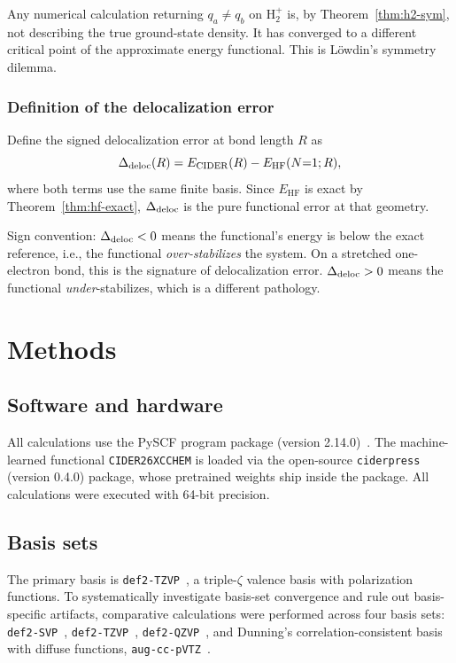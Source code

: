 \documentclass[11pt]{report}
\theoremstyle{definition}
\theoremstyle{remark}
\newcommand{\EHF}{E_{\mathrm{HF}}}
\newcommand{\ECD}{E_{\mathrm{CIDER}}}
\begin{document}
Any numerical calculation returning $q_a \ne q_b$ on H$_2^+$ is, by
Theorem~\ref{thm:h2-sym}, not describing the true ground-state density.
It has converged to a different critical point of the approximate energy
functional. This is L\"owdin's symmetry dilemma.

\subsection{Definition of the delocalization error}

Define the signed delocalization error at bond length $R$ as
\begin{equation}
\Delta_{\rm deloc}(R) = \ECD(R) - \EHF(N{=}1; R),
\label{eq:deloc-def}
\end{equation}
where both terms use the same finite basis. Since $\EHF$ is exact by
Theorem~\ref{thm:hf-exact}, $\Delta_{\rm deloc}$ is the pure functional
error at that geometry.

Sign convention: $\Delta_{\rm deloc} < 0$ means the functional's energy is
below the exact reference, i.e., the functional \emph{over-stabilizes}
the system. On a stretched one-electron bond, this is the signature of
delocalization error. $\Delta_{\rm deloc} > 0$ means the functional
\emph{under}-stabilizes, which is a different pathology.

\chapter{Methods}
\label{ch:methods}

\section{Software and hardware}

All calculations use the PySCF program package (version 2.14.0)~\cite{PySCF2018,PySCF2020}. The machine-learned functional
\texttt{CIDER26XCCHEM} is loaded via the open-source \texttt{ciderpress} (version 0.4.0)
package, whose pretrained weights ship inside the package. All calculations were executed with 64-bit precision.

\section{Basis sets}

The primary basis is \texttt{def2-TZVP}~\cite{Weigend2005}, a triple-$\zeta$ valence basis
with polarization functions. To systematically investigate basis-set convergence and rule out basis-specific artifacts,
comparative calculations were performed across four basis sets: \texttt{def2-SVP}~\cite{Weigend2005}, \texttt{def2-TZVP}~\cite{Weigend2005},
\texttt{def2-QZVP}~\cite{Weigend2005}, and Dunning's correlation-consistent basis with diffuse functions, \texttt{aug-cc-pVTZ}~\cite{Dunning1989}.
\end{document}
